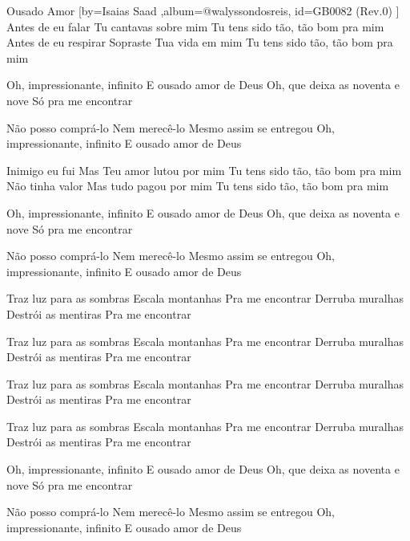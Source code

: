 \beginsong
{Ousado Amor %
}[by={Isaias Saad %
},album={@walyssondosreis},
id={GB0082 %
(Rev.0) %
}]
Antes de eu falar
Tu cantavas sobre mim
Tu tens sido tão, tão bom pra mim
Antes de eu respirar
Sopraste Tua vida em mim
Tu tens sido tão, tão bom pra mim

Oh, impressionante, infinito
E ousado amor de Deus
Oh, que deixa as noventa e nove
Só pra me encontrar

Não posso comprá-lo
Nem merecê-lo
Mesmo assim se entregou
Oh, impressionante, infinito
E ousado amor de Deus

Inimigo eu fui
Mas Teu amor lutou por mim
Tu tens sido tão, tão bom pra mim
Não tinha valor
Mas tudo pagou por mim
Tu tens sido tão, tão bom pra mim

Oh, impressionante, infinito
E ousado amor de Deus
Oh, que deixa as noventa e nove
Só pra me encontrar

Não posso comprá-lo
Nem merecê-lo
Mesmo assim se entregou
Oh, impressionante, infinito
E ousado amor de Deus

Traz luz para as sombras
Escala montanhas
Pra me encontrar
Derruba muralhas
Destrói as mentiras
Pra me encontrar

Traz luz para as sombras
Escala montanhas
Pra me encontrar
Derruba muralhas
Destrói as mentiras
Pra me encontrar

Traz luz para as sombras
Escala montanhas
Pra me encontrar
Derruba muralhas
Destrói as mentiras
Pra me encontrar

Traz luz para as sombras
Escala montanhas
Pra me encontrar
Derruba muralhas
Destrói as mentiras
Pra me encontrar

Oh, impressionante, infinito
E ousado amor de Deus
Oh, que deixa as noventa e nove
Só pra me encontrar

Não posso comprá-lo
Nem merecê-lo
Mesmo assim se entregou
Oh, impressionante, infinito
E ousado amor de Deus


